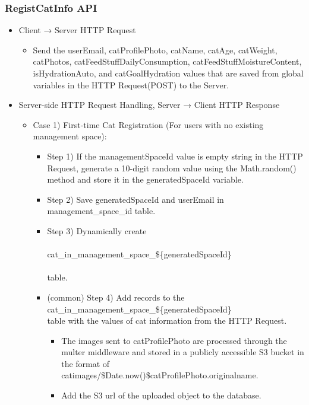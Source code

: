 \documentclass[conference]{IEEEtran}
\begin{document}
\subsubsection{RegistCatInfo API}
\begin{itemize}
    \item Client → Server HTTP Request
    \begin{itemize}
        \item Send the userEmail, catProfilePhoto, catName, catAge, catWeight, catPhotos, catFeedStuffDailyConsumption, catFeedStuffMoistureContent, isHydrationAuto, and catGoalHydration values that are saved from global variables in the HTTP Request(POST) to the Server.
    \end{itemize}
    \item Server-side HTTP Request Handling, Server → Client HTTP Response
    \begin{itemize}
        \item Case 1) First-time Cat Registration (For users with no existing management space):
        \begin{itemize}
            \item Step 1) If the managementSpaceId value is empty string in the HTTP Request, generate a 10-digit random value using the Math.random() method and store it in the generatedSpaceId variable.
            \item Step 2) Save generatedSpaceId and userEmail in management\_space\_id table.
            \item Step 3) Dynamically create \\\\cat\_in\_management\_space\_\$\{generatedSpaceId\}\\\\ table.
            \item (common) Step 4) Add records to the \\cat\_in\_management\_space\_\$\{generatedSpaceId\}\\ table with the values of cat information from the HTTP Request.
            \begin{itemize}
                \item The images sent to catProfilePhoto are processed through the multer middleware and stored in a publicly accessible S3 bucket in the format of catimages/\${Date.now()}\${catProfilePhoto.originalname}.
                \item Add the S3 url of the uploaded object to the database.
            \end{itemize}

\end{itemize}
\end{itemize}
\end{itemize}
\end{document}
